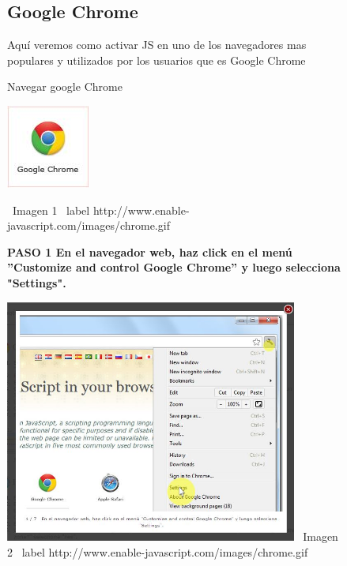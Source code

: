 \documentclass[11pt]{article} %
\begin{document}
\begin{figure}
\subsection{Google Chrome}
Aquí veremos como activar JS en uno de los navegadores mas populares y utilizados por los usuarios que es Google Chrome 


\begin{center}
\begin{center}
Navegar google Chrome
\end{center}
\includegraphics[height=3 cm, width=3 cm] {imagenes/chrome.jpg}

\ Imagen 1
\ label { http://www.enable-javascript.com/images/chrome.gif }
\newline
\newline
\begin{center}

\bf PASO 1 
 En el navegador web, haz click en el menú ''Customize and control Google Chrome'' 
y luego selecciona "Settings".
\end{center}

\includegraphics[height=8cm, width=8 cm] {imagenes/chrome 01.jpg}
\newline
\  Imagen 2
\ label { http://www.enable-javascript.com/images/chrome.gif }
\newline

\end{center}
\end{figure}
\end{document}
